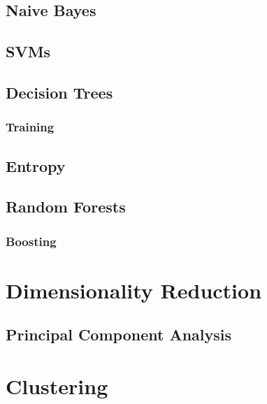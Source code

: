 \documentclass[
]{book}
\begin{document}
\hypertarget{naive-bayes}{%
\subsection{Naive Bayes}\label{naive-bayes}}

\hypertarget{svms}{%
\subsection{SVMs}\label{svms}}

\hypertarget{decision-trees}{%
\subsection{Decision Trees}\label{decision-trees}}

\hypertarget{training}{%
\subsubsection{Training}\label{training}}

\hypertarget{entropy}{%
\subsection{Entropy}\label{entropy}}

\hypertarget{random-forests}{%
\subsection{Random Forests}\label{random-forests}}

\hypertarget{boosting}{%
\subsubsection{Boosting}\label{boosting}}

\hypertarget{dimensionality-reduction}{%
\section{Dimensionality Reduction}\label{dimensionality-reduction}}

\hypertarget{principal-component-analysis}{%
\subsection{Principal Component Analysis}\label{principal-component-analysis}}

\hypertarget{clustering}{%
\section{Clustering}\label{clustering}}
\end{document}

